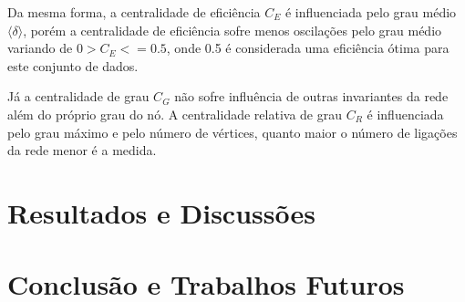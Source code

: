 \documentclass[12pt]{article}
\begin{document}
Da mesma forma, a centralidade de eficiência $C_E$ é influenciada pelo grau médio $\langle \delta \rangle$, porém a centralidade de eficiência sofre menos oscilações pelo grau médio variando de $0>C_E<=0.5$, onde 0.5 é considerada uma eficiência ótima para este conjunto de dados.

Já a centralidade de grau $C_G$ não sofre influência de outras invariantes da rede além do próprio grau do nó. 
A centralidade relativa de grau $C_R$ é influenciada pelo grau máximo e pelo número de vértices, quanto maior o número de ligações da rede menor é a medida.




\section{Resultados e Discussões}\label{sec:result}


\section{Conclusão e Trabalhos Futuros}\label{sec:conc}



\end{document}

